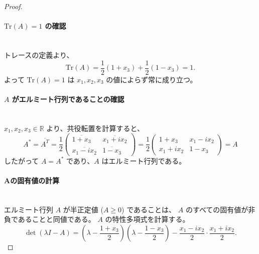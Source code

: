\documentclass[dvipdfmx,a4paper]{jsarticle}
\theoremstyle{mystyle}
\begin{document}
\section*{}


\begin{proof}\ \\

\paragraph{\textbf{$\mathrm{Tr}(A) = 1$ の確認}}\ \\
\noindent
トレースの定義より、
\[
  \mathrm{Tr}(A)
  = \frac{1}{2}(1 + x_3) + \frac{1}{2}(1 - x_3)
  = 1.
\]
よって $\mathrm{Tr}(A) = 1$ は $x_1, x_2, x_3$ の値によらず常に成り立つ。

\vspace{0.8em}
\noindent
\paragraph{\textbf{$A$ がエルミート行列であることの確認}}\ \\
\noindent
$x_1, x_2, x_3 \in \mathbb{R}$ より、共役転置を計算すると、
\[
  A^* = \overline{A^T} =\frac{1}{2}
  \begin{pmatrix}
    \overline{1 + x_3} & \overline{x_1 + ix_2} \\
    \overline{x_1 - ix_2} & \overline{1 - x_3}
  \end{pmatrix}
  = \frac{1}{2}
  \begin{pmatrix}
    1 + x_3 & x_1 - ix_2 \\
    x_1 + ix_2 & 1 - x_3
  \end{pmatrix}
  = A
\]
したがって $A = A^*$ であり、$A$ はエルミート行列である。

\vspace{0.8em}
\noindent
\paragraph{\textbf{Aの固有値の計算}}\ \\
\noindent
エルミート行列 $A$ が半正定値 ($A \geq 0$) であることは、
$A$ のすべての固有値が非負であることと同値である。
$A$ の特性多項式を計算する。
\[
  \det(\lambda I - A)
  = \left(\lambda - \frac{1+x_3}{2}\right)\!\left(\lambda - \frac{1-x_3}{2}\right)
    - \frac{x_1 - ix_2}{2} \cdot \frac{x_1 + ix_2}{2}.
\]


\end{proof}
\end{document}
